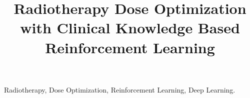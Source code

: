 \documentclass{midl} %
\title[Radiotherapy Optimization with Clinical Knowledge]{Radiotherapy Dose Optimization with Clinical Knowledge Based Reinforcement Learning}
\begin{document}
\maketitle

\begin{abstract}
	
\end{abstract}

\begin{keywords}
	Radiotherapy, Dose Optimization, Reinforcement Learning, Deep Learning.
\end{keywords}





\end{document}

